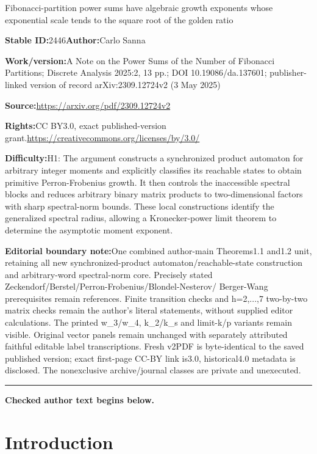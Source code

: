\documentclass[11pt]{article}
\theoremstyle{remark}\newtheorem{remark}[theorem]{Remark}
\begin{document}
\begin{center}\Large Fibonacci-partition power sums have algebraic growth exponents whose exponential scale tends to the square root of the golden ratio\end{center}\noindent\textbf{Stable ID:}2446\quad\textbf{Author:}Carlo Sanna\par\noindent\textbf{Work/version:}A Note on the Power Sums of the Number of Fibonacci Partitions; Discrete Analysis 2025:2, 13 pp.; DOI 10.19086/da.137601; publisher-linked version of record arXiv:2309.12724v2 (3 May 2025)\par\noindent\textbf{Source:}\url{https://arxiv.org/pdf/2309.12724v2}\par\noindent\textbf{Rights:}CC BY3.0, exact published-version grant.\url{https://creativecommons.org/licenses/by/3.0/}\par\noindent\textbf{Difficulty:}H1: The argument constructs a synchronized product automaton for arbitrary integer moments and explicitly classifies its reachable states to obtain primitive Perron-Frobenius growth. It then controls the inaccessible spectral blocks and reduces arbitrary binary matrix products to two-dimensional factors with sharp spectral-norm bounds. These local constructions identify the generalized spectral radius, allowing a Kronecker-power limit theorem to determine the asymptotic moment exponent.\par\medskip\noindent\textbf{Editorial boundary note:}One combined author-main Theorems1.1 and1.2 unit, retaining all new synchronized-product automaton/reachable-state construction and arbitrary-word spectral-norm core. Precisely stated Zeckendorf/Berstel/Perron-Frobenius/Blondel-Nesterov/ Berger-Wang prerequisites remain references. Finite transition checks and h=2,...,7 two-by-two matrix checks remain the author's literal statements, without supplied editor calculations. The printed w\_3/w\_4, k\_2/k\_s and limit-k/p variants remain visible. Original vector panels remain unchanged with separately attributed faithful editable label transcriptions. Fresh v2PDF is byte-identical to the saved published version; exact first-page CC-BY link is3.0, historical4.0 metadata is disclosed. The nonexclusive archive/journal classes are private and unexecuted.\par\medskip\hrule\medskip\noindent\textbf{Checked author text begins below.}\par
\section{Introduction}
\end{document}

